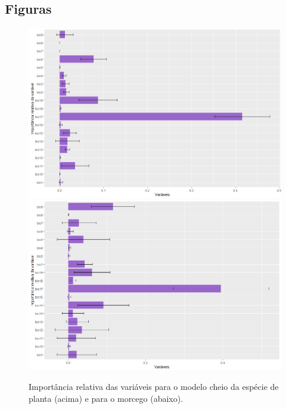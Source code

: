 \documentclass[
  11pt,
]{article}
\begin{document}
\clearpage

\hypertarget{figuras}{%
\subsection{Figuras}\label{figuras}}

\begin{figure}

{\centering \includegraphics[width=0.73\linewidth]{../Rmarkdown/importancia_vars_planta} \includegraphics[width=0.73\linewidth]{importancia_vars_morcego} 

}

\caption{Importância relativa das variáveis para o modelo cheio da espécie de planta (acima) e para o morcego (abaixo).}\label{fig:vif}
\end{figure}

\clearpage
\end{document}
